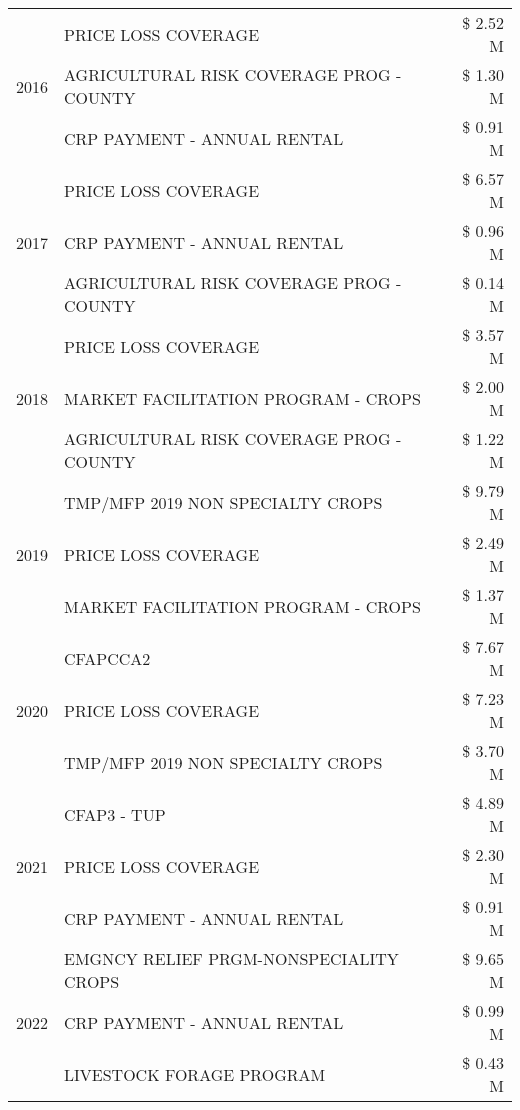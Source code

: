 \begin{tabular}{llr}
\cline{1-3}
\multirow[t]{3}{*}{2016} & PRICE LOSS COVERAGE & \$ 2.52 M \\
 & AGRICULTURAL RISK COVERAGE PROG - COUNTY & \$ 1.30 M \\
 & CRP PAYMENT - ANNUAL RENTAL & \$ 0.91 M \\
\cline{1-3}
\multirow[t]{3}{*}{2017} & PRICE LOSS COVERAGE & \$ 6.57 M \\
 & CRP PAYMENT - ANNUAL RENTAL & \$ 0.96 M \\
 & AGRICULTURAL RISK COVERAGE PROG - COUNTY & \$ 0.14 M \\
\cline{1-3}
\multirow[t]{3}{*}{2018} & PRICE LOSS COVERAGE & \$ 3.57 M \\
 & MARKET FACILITATION PROGRAM - CROPS & \$ 2.00 M \\
 & AGRICULTURAL RISK COVERAGE PROG - COUNTY & \$ 1.22 M \\
\cline{1-3}
\multirow[t]{3}{*}{2019} & TMP/MFP 2019 NON SPECIALTY CROPS & \$ 9.79 M \\
 & PRICE LOSS COVERAGE & \$ 2.49 M \\
 & MARKET FACILITATION PROGRAM - CROPS & \$ 1.37 M \\
\cline{1-3}
\multirow[t]{3}{*}{2020} & CFAPCCA2 & \$ 7.67 M \\
 & PRICE LOSS COVERAGE & \$ 7.23 M \\
 & TMP/MFP 2019 NON SPECIALTY CROPS & \$ 3.70 M \\
\cline{1-3}
\multirow[t]{3}{*}{2021} & CFAP3 - TUP & \$ 4.89 M \\
 & PRICE LOSS COVERAGE & \$ 2.30 M \\
 & CRP PAYMENT - ANNUAL RENTAL & \$ 0.91 M \\
\cline{1-3}
\multirow[t]{3}{*}{2022} & EMGNCY RELIEF PRGM-NONSPECIALITY CROPS & \$ 9.65 M \\
 & CRP PAYMENT - ANNUAL RENTAL & \$ 0.99 M \\
 & LIVESTOCK FORAGE PROGRAM & \$ 0.43 M \\
\cline{1-3}
\bottomrule
\end{tabular}
